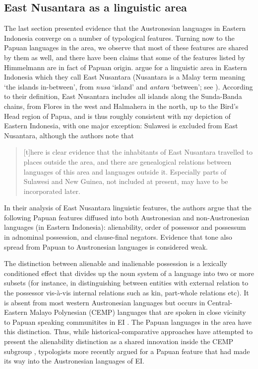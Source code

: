 \subsection{East Nusantara as a linguistic area}\label{sec:nusantara}

The last section presented evidence that the Austronesian languages in Eastern Indonesia converge on a number of typological features. Turning now to the Papuan languages in the area, we observe that most of these features are shared by them as well, and there have been claims that some of the features listed by Himmelmann are in fact of Papuan origin. \citet{klamer2008east} argue for a linguistic area in Eastern Indonesia which they call East Nusantara (Nusantara is a Malay term meaning `the islands in-between', from \textit{nusa} `island' and \textit{antara} `between'; see \citealt[99]{klamer2008east}). According to their definition, East Nusantara includes all islands along the Sunda-Banda chains, from Flores in the west and Halmahera in the north, up to the Bird's Head region of  Papua, and is thus roughly consistent with my depiction of Eastern Indonesia, with one major exception: Sulawesi is excluded from East Nusantara, although the authors note that 

\begin{quote}[t]here is clear evidence that the inhabitants of East Nusantara travelled to places outside the area, and there are genealogical relations between languages of this area and languages outside it. Especially parts of Sulawesi and New Guinea, not included at present, may have to be incorporated later.\end{quote}

In their analysis of East Nusantara linguistic features, the authors argue that the following Papuan features diffused into both Austronesian and non-Aus\-tro\-ne\-sian languages (in Eastern Indonesia): alienability, order of possessor and possessum in adnominal possession, and clause-final negators. Evidence that tone also spread from Papuan to Austronesian languages is considered weak.

The distinction between alienable and inalienable possession is a lexically conditioned effect that divides up the noun system of a language into two or more subsets (for instance, in distinguishing between entities with external relation to the possessor vis-à-vis internal relations such as kin, part-whole relations etc). It is absent from most western Austronesian languages but occurs in Central-Eastern Malayo Polynesian (CEMP) languages that are spoken in close vicinity to Papuan speaking communitites in EI \citep[116]{klamer2008east}. The Papuan languages in the area have this distinction. Thus, while historical-comparative approaches have attempted to present the alienability distinction as a shared innovation inside the CEMP subgroup \citep{blust1993central}, typologists more recently argued for a Papuan feature that had made its way into the Austronesian languages of EI.  

